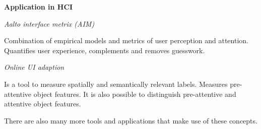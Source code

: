 \textbf{Application in HCI} \smallskip

\textit{Aalto interface metrix (AIM)} \smallskip

Combination of empirical models and metrics of user perception and attention. 
Quantifies user experience, complements and removes guesswork. \medskip


\textit{Online UI adaption} \smallskip

Is a tool to measure spatially and semantically relevant labels. Measures pre-attentive object features. It is also possible to distinguish pre-attentive and attentive object features. \medskip

There are also many more tools and applications that make use of these concepts. 

\columnbreak


